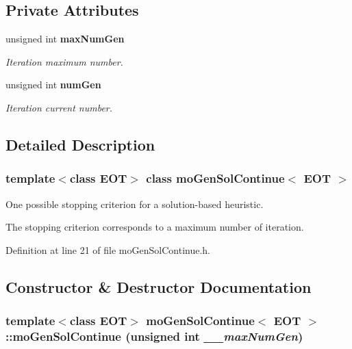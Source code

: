 \subsection*{Private Attributes}
\begin{CompactItemize}
\item 
unsigned int {\bf maxNumGen}\label{classmo_gen_sol_continue_30b9861e090578bdfa2374806600987a}

\begin{CompactList}\small\item\em Iteration maximum number. \item\end{CompactList}\item 
unsigned int {\bf numGen}\label{classmo_gen_sol_continue_630d9736a3a2c952540cdc211764258c}

\begin{CompactList}\small\item\em Iteration current number. \item\end{CompactList}\end{CompactItemize}


\subsection{Detailed Description}
\subsubsection*{template$<$class EOT$>$ class moGenSolContinue$<$ EOT $>$}

One possible stopping criterion for a solution-based heuristic. 

The stopping criterion corresponds to a maximum number of iteration. 



Definition at line 21 of file moGenSolContinue.h.

\subsection{Constructor \& Destructor Documentation}
\subsubsection{\setlength{\rightskip}{0pt plus 5cm}template$<$class EOT$>$ {\bf moGenSolContinue}$<$ EOT $>$::{\bf moGenSolContinue} (unsigned int {\em \_\-\_\-maxNumGen})\hspace{0.3cm}{\tt  [inline]}}\label{classmo_gen_sol_continue_b56e890f1caa3f98e161c6512b59c95b}


